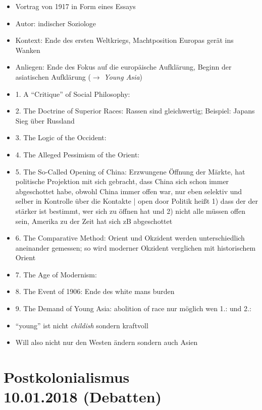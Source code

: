 \documentclass[emulatestandardclasses]{scrartcl}
\begin{document}
\begin{itemize}
  \item Vortrag von 1917 in Form eines Essays
  \item Autor: indischer Soziologe
  \item Kontext: Ende des ersten Weltkriegs, Machtposition Europas gerät ins Wanken
  \item Anliegen: Ende des Fokus auf die europäische Aufklärung, Beginn der asiatischen Aufklärung ($\rightarrow$ \emph{Young Asia})
  \item 1. A "`Critique"' of Social Philosophy: 
  \item 2. The Doctrine of Superior Races: Rassen sind gleichwertig; Beispiel: Japans Sieg über Russland
  \item 3. The Logic of the Occident: 
  \item 4. The Alleged Pessimism of the Orient: 
  \item 5. The So-Called Opening of China: Erzwungene Öffnung der Märkte, hat politische Projektion mit sich gebracht, dass China sich schon immer abgeschottet habe, obwohl China immer offen war, nur eben selektiv und selber in Kontrolle über die Kontakte | open door Politik heißt 1) dass der der stärker ist bestimmt, wer sich zu öffnen hat und 2) nicht alle müssen offen sein, Amerika zu der Zeit hat sich zB abgeschottet
  \item 6. The Comparative Method: Orient und Okzident werden unterschiedlich aneinander gemessen; so wird moderner Okzident verglichen mit historischem Orient
  \item 7. The Age of Modernism: 
  \item 8. The Event of 1906: Ende des white mans burden
  \item 9. The Demand of Young Asia: abolition of race nur möglich wen 1.: und 2.:
  \item "`young"' ist nicht \emph{childish} sondern kraftvoll
  \item Will also nicht nur den Westen ändern sondern auch Asien
\end{itemize}

\section{Postkolonialismus\\10.01.2018 (Debatten)}
\end{document}
